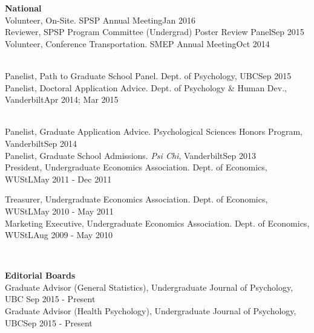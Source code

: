 {\large \textbf{National}}\smallskip\\
Volunteer, On-Site. SPSP Annual Meeting\hfill{Jan 2016}\smallskip\\
Reviewer, SPSP Program Committee (Undergrad) Poster Review Panel\hfill{Sep 2015}\smallskip\\
Volunteer, Conference Transportation. SMEP Annual Meeting\hfill{Oct 2014}\medskip\\
\begin{minipage}{\linewidth}\smallskip\\
Panelist, Path to Graduate School Panel. Dept. of Psychology, UBC\hfill {Sep 2015}\smallskip\\
Panelist, Doctoral Application Advice. Dept. of Psychology \& Human Dev., Vanderbilt\hfill {Apr 2014; Mar 2015}\vspace{1.1mm}\end{minipage}\smallskip\\
Panelist, Graduate Application Advice. Psychological Sciences Honors Program, Vanderbilt\hfill {Sep 2014}\smallskip\\
Panelist, Graduate School Admissions. \textit{Psi Chi}, Vanderbilt\hfill {Sep 2013}\smallskip\\
President, Undergraduate Economics Association. Dept. of Economics, WUStL\hfill  {May 2011 - Dec 2011}\smallskip\\
\begin{minipage}{\linewidth}\vspace{1.1mm} Treasurer, Undergraduate Economics Association. Dept. of Economics, WUStL\hfill{May 2010 - May 2011}\smallskip\\
Marketing Executive, Undergraduate Economics Association. Dept. of Economics, WUStL\hfill  {Aug 2009 - May 2010}\end{minipage}\medskip\\
\begin{minipage}{\linewidth}\vspace{1.1mm} {\large \textbf{Editorial Boards}}\\
Graduate Advisor (General Statistics), Undergraduate Journal of Psychology, UBC \hfill{Sep 2015 - Present}\smallskip\\
Graduate Advisor (Health Psychology), Undergraduate Journal of Psychology, UBC\hfill{Sep 2015 - Present}\end{minipage}\medskip\\
